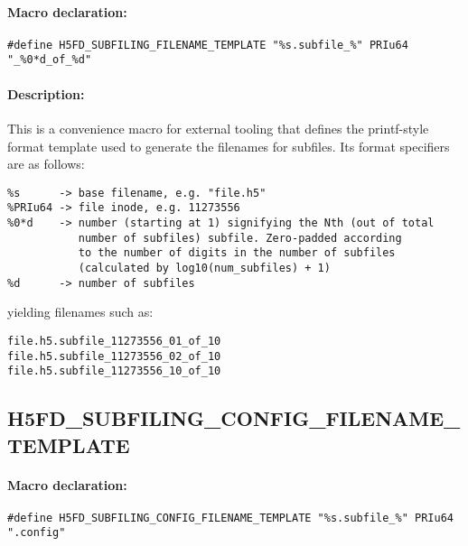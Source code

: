 \documentclass[../main.tex]{subfiles}
\begin{document}
\paragraph{Macro declaration:}
\begin{flushleft}%
\begin{verbatim}
#define H5FD_SUBFILING_FILENAME_TEMPLATE "%s.subfile_%" PRIu64 "_%0*d_of_%d"
\end{verbatim}
\end{flushleft}%

\paragraph{Description:}
\begin{flushleft}%
This is a convenience macro for external tooling that defines the printf-style
format template used to generate the filenames for subfiles. Its format specifiers
are as follows:

\begin{verbatim}
%s      -> base filename, e.g. "file.h5"
%PRIu64 -> file inode, e.g. 11273556
%0*d    -> number (starting at 1) signifying the Nth (out of total
           number of subfiles) subfile. Zero-padded according
           to the number of digits in the number of subfiles
           (calculated by log10(num_subfiles) + 1)
%d      -> number of subfiles
\end{verbatim}

yielding filenames such as:

\begin{verbatim}
file.h5.subfile_11273556_01_of_10
file.h5.subfile_11273556_02_of_10
file.h5.subfile_11273556_10_of_10
\end{verbatim}
\end{flushleft}%

\newpage

\subsection{H5FD\_SUBFILING\_CONFIG\_FILENAME\_TEMPLATE}
\label{ref:h5fd_subfiling_config_filename_template}

\paragraph{Macro declaration:}
\begin{flushleft}%
\begin{verbatim}
#define H5FD_SUBFILING_CONFIG_FILENAME_TEMPLATE "%s.subfile_%" PRIu64 ".config"
\end{verbatim}
\end{flushleft}%
\end{document}
